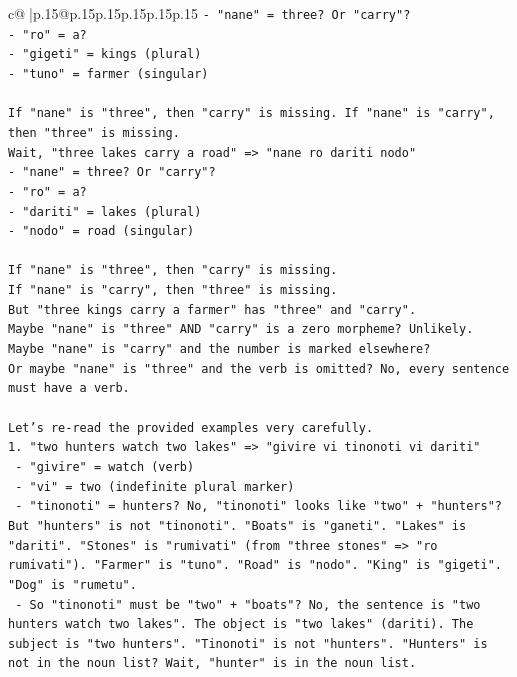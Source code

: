 \documentclass{article}
\begin{document}
{\begin{supertabular}{c@{$\;$}|p{.15\linewidth}@{}p{.15\linewidth}p{.15\linewidth}p{.15\linewidth}p{.15\linewidth}p{.15\linewidth}}
{{{\texttt{{-} "nane" = three? Or "carry"?} \\
\texttt{{-} "ro" = a?} \\
\texttt{{-} "gigeti" = kings (plural)} \\
\texttt{{-} "tuno" = farmer (singular)} \\
\\ 
\texttt{If "nane" is "three", then "carry" is missing. If "nane" is "carry", then "three" is missing.} \\
\texttt{Wait, "three lakes carry a road" => "nane ro dariti nodo"} \\
\texttt{{-} "nane" = three? Or "carry"?} \\
\texttt{{-} "ro" = a?} \\
\texttt{{-} "dariti" = lakes (plural)} \\
\texttt{{-} "nodo" = road (singular)} \\
\\ 
\texttt{If "nane" is "three", then "carry" is missing.} \\
\texttt{If "nane" is "carry", then "three" is missing.} \\
\texttt{But "three kings carry a farmer" has "three" and "carry".} \\
\texttt{Maybe "nane" is "three" AND "carry" is a zero morpheme? Unlikely.} \\
\texttt{Maybe "nane" is "carry" and the number is marked elsewhere?} \\
\texttt{Or maybe "nane" is "three" and the verb is omitted? No, every sentence must have a verb.} \\
\\ 
\texttt{Let's re{-}read the provided examples very carefully.} \\
\texttt{1. "two hunters watch two lakes" => "givire vi tinonoti vi dariti"} \\
\texttt{   {-} "givire" = watch (verb)} \\
\texttt{   {-} "vi" = two (indefinite plural marker)} \\
\texttt{   {-} "tinonoti" = hunters? No, "tinonoti" looks like "two" + "hunters"? But "hunters" is not "tinonoti". "Boats" is "ganeti". "Lakes" is "dariti". "Stones" is "rumivati" (from "three stones" => "ro rumivati"). "Farmer" is "tuno". "Road" is "nodo". "King" is "gigeti". "Dog" is "rumetu".} \\
\texttt{   {-} So "tinonoti" must be "two" + "boats"? No, the sentence is "two hunters watch two lakes". The object is "two lakes" (dariti). The subject is "two hunters". "Tinonoti" is not "hunters". "Hunters" is not in the noun list? Wait, "hunter" is in the noun list.} \\
}}}
\end{supertabular}}
\end{document}
